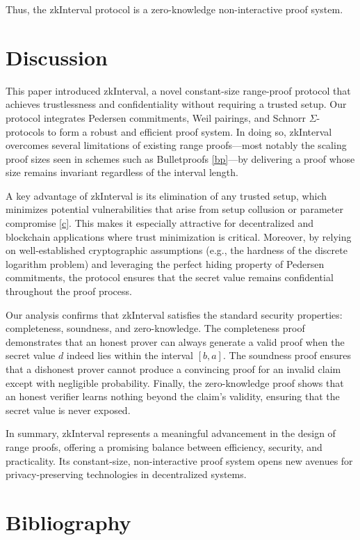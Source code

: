 \documentclass[version=preprint]{iacrcc}
\begin{document}
Thus, the zkInterval protocol is a zero-knowledge non-interactive proof system.

\section{Discussion}

This paper introduced zkInterval, a novel constant-size range-proof protocol that achieves trustlessness and confidentiality without requiring a trusted setup. Our protocol integrates Pedersen commitments, Weil pairings, and Schnorr \(\Sigma\)-protocols to form a robust and efficient proof system. In doing so, zkInterval overcomes several limitations of existing range proofs—most notably the scaling proof sizes seen in schemes such as Bulletproofs \ref{bp}—by delivering a proof whose size remains invariant regardless of the interval length.

A key advantage of zkInterval is its elimination of any trusted setup, which minimizes potential vulnerabilities that arise from setup collusion or parameter compromise \ref{c}. This makes it especially attractive for decentralized and blockchain applications where trust minimization is critical. Moreover, by relying on well-established cryptographic assumptions (e.g., the hardness of the discrete logarithm problem) and leveraging the perfect hiding property of Pedersen commitments, the protocol ensures that the secret value remains confidential throughout the proof process.

Our analysis confirms that zkInterval satisfies the standard security properties: completeness, soundness, and zero-knowledge. The completeness proof demonstrates that an honest prover can always generate a valid proof when the secret value \(d\) indeed lies within the interval \([b, a]\). The soundness proof ensures that a dishonest prover cannot produce a convincing proof for an invalid claim except with negligible probability. Finally, the zero-knowledge proof shows that an honest verifier learns nothing beyond the claim's validity, ensuring that the secret value is never exposed.

In summary, zkInterval represents a meaningful advancement in the design of range proofs, offering a promising balance between efficiency, security, and practicality. Its constant-size, non-interactive proof system opens new avenues for privacy-preserving technologies in decentralized systems.

\section{Bibliography}

\end{document}
